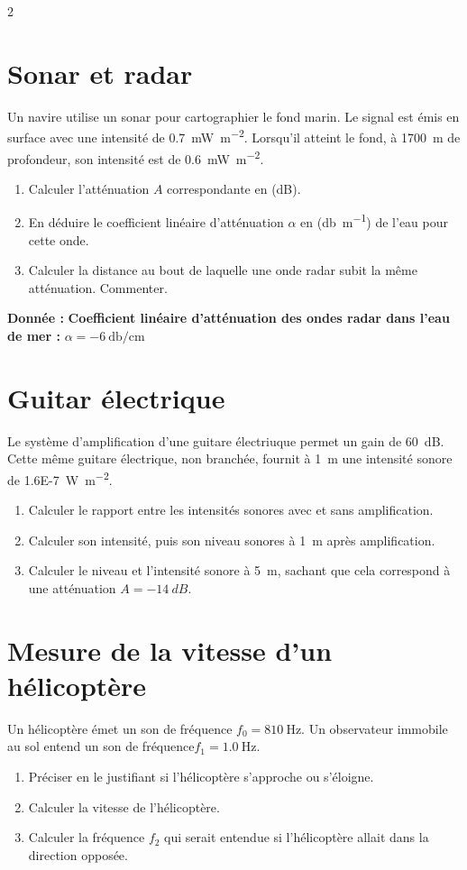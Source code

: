 \documentclass[a4paper,11pt,fleqn]{article}%
\begin{document}
\begin{multicols}{2}
\section{Sonar et radar}
Un navire utilise un sonar pour cartographier le fond marin. Le signal est émis en surface avec une intensité de \SI{0,7}{\milli\watt\per\meter\squared}. Lorsqu'il atteint le fond, à \SI{1700}{m} de profondeur, son intensité est de \SI{0,6}{\milli\watt\per\meter\squared}.
\begin{enumerate}
    \item Calculer l'atténuation $A$ correspondante en (\unit{dB}).
    \item En déduire le coefficient linéaire d'atténuation $\alpha$ en (\unit{\decibel\per\meter}) de l'eau pour cette onde.
    \item Calculer la distance au bout de laquelle une onde radar subit la même atténuation. Commenter.
\end{enumerate}
\textbf{Donnée :} \textbf{Coefficient linéaire d'atténuation des ondes radar dans l'eau de mer :} $\alpha =\SI{-6}{\decibel\per\centi\meter}$

\section{Guitar électrique}
Le système d'amplification d'une guitare électriuque permet un gain de \SI{+60}{dB}.\\
Cette même guitare électrique, non branchée, fournit à \SI{1}{m} une intensité sonore de \SI{1.6E-7}{\watt\per\meter\squared}.

\begin{enumerate}
    \item Calculer le rapport entre les intensités sonores avec et sans amplification.
    \item Calculer son intensité, puis son niveau sonores à \SI{1}{m} après amplification.
    \item Calculer le niveau et l'intensité sonore à \SI{5}{m}, sachant que cela correspond à une atténuation $A = \SI{-14}{dB}$.
\end{enumerate}

\section{Mesure de la vitesse d'un hélicoptère}
Un hélicoptère émet un son de fréquence $f_0=\SI{810}{\hertz}$. Un observateur immobile au sol entend un son de fréquence$f_1=\SI{1.0}{\hertz}$.
\begin{enumerate}
    \item Préciser en le justifiant si l'hélicoptère s'approche ou s'éloigne.
    \item Calculer la vitesse de l'hélicoptère.
    \item Calculer la fréquence $f_2$ qui serait entendue si l'hélicoptère allait dans la direction opposée.
\end{enumerate}


\end{multicols}
\end{document}
